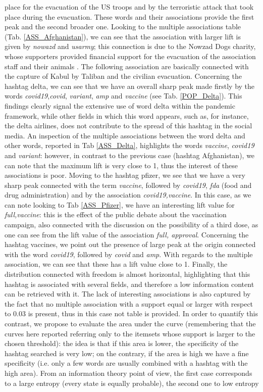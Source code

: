 \documentclass[12pt,%
               a4paper,%
               oneside,openany,%
               titlepage,%
               headinclude,footinclude,%
               BCOR5mm,%
               cleardoublepage=empty,%
               tablecaptionabove,%
               floatperchapter,
               ]{scrreprt}                 %
\begin{document}
place for the evacuation of the US troops and by the terroristic attack that took place during the evacuation. These words and their associations provide the first peak and the second broader one. Looking to the multiple associations table (Tab. \ref{ASS_Afghanistan}), we can see that the association with larger lift is given by \textit{nowazd} and \textit{usarmy}; this connection is due to the Nowzad Dogs charity, whose supporters provided financial support for the evacuation of the association staff and their animals \cite{Nowzad}. The following association are basically connected with the capture of Kabul by Taliban and the civilian evacuation. Concerning the hashtag delta, we can see that we have an overall sharp peak made firstly by the words \textit{covid19},\textit{covid}, \textit{variant}, \textit{amp} and \textit{vaccine} (see Tab. \ref{POP_Delta}). This findings clearly signal the extensive use of word delta within the pandemic framework, while other fields in which this word appears, such as, for instance, the delta airlines, does not contribute to the spread of this hashtag in the social media. An inspection of the multiple associations between the word delta and other words, reported in Tab \ref{ASS_Delta}, highlights the words \textit{vaccine}, \textit{covid19} and \textit{variant}: however, in contrast to the previous case (hashtag Afghanistan), we can note that the maximum lift is very close to 1, thus the interest of these associations is poor. Moving to the hashtag pfizer, we see that we have a very sharp peak connected with the term \textit{vaccine}, followed by \textit{covid19}, \textit{fda} (food and drug administration) and by the association \textit{covid19,vaccine}. In this case, as we can note looking to Tab \ref{ASS_Pfizer}, we have an interesting lift value for \textit{full,vaccine}: this is the effect of the public debate about the vaccination campaign, also connected with the discussion on the possibility of a third dose, as one can see from the lift value of the association \textit{full, approval}. Concerning the hashtag vaccines, we point out the presence of large peak at the origin connected with the word \textit{covid19}, followed by \textit{covid} and \textit{amp}. With regards to the multiple association, we can see that these has a lift value close to 1. Finally, the distribution connected with freedom is almost horizontal, highlighting that this hashtag is associated with several fields, and therefore a low information content can be retrieved with it. The lack of interesting associations is also captured by the fact that no multiple association with a support equal or larger with respect to 0.03 is present, thus in this case not table is provided. In order to quantify this contrast, we propose to evaluate the area under the curve (remembering that the curves here reported referring only to the itemsets whose support is larger to the chosen threshold): the idea is that if this area is lower, the specificity of the hashtag searched is very low; on the contrary, if the area is high we have a fine specificity (i.e. only a few words are usually combined with a hashtag with the high area). From an information theory point of view, the first case corresponds to a large entropy (every state is equally probable), the second one to low entropy 
\end{document}
